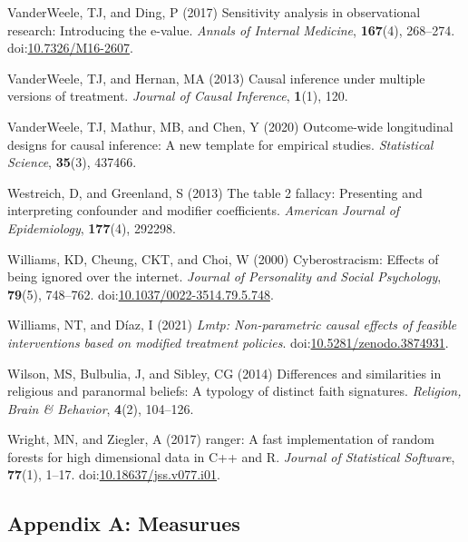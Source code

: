 \documentclass[
  singlecolumn]{article}
\newlength{\cslhangindent}
\newenvironment{CSLReferences}[2] %
 {\begin{list}{}{%
  \setlength{\itemindent}{0pt}
  \setlength{\leftmargin}{0pt}
  \setlength{\parsep}{0pt}
  \ifodd #1
   \setlength{\leftmargin}{\cslhangindent}
   \setlength{\itemindent}{-1\cslhangindent}
  \fi
  \setlength{\itemsep}{#2\baselineskip}}}
 {\end{list}}
\begin{document}
\begin{CSLReferences}{1}{0}
VanderWeele, TJ, and Ding, P (2017) Sensitivity analysis in
observational research: Introducing the e-value. \emph{Annals of
Internal Medicine}, \textbf{167}(4), 268--274.
doi:\href{https://doi.org/10.7326/M16-2607}{10.7326/M16-2607}.

VanderWeele, TJ, and Hernan, MA (2013) Causal inference under multiple
versions of treatment. \emph{Journal of Causal Inference},
\textbf{1}(1), 120.

VanderWeele, TJ, Mathur, MB, and Chen, Y (2020) Outcome-wide
longitudinal designs for causal inference: A new template for empirical
studies. \emph{Statistical Science}, \textbf{35}(3), 437466.

Westreich, D, and Greenland, S (2013) The table 2 fallacy: Presenting
and interpreting confounder and modifier coefficients. \emph{American
Journal of Epidemiology}, \textbf{177}(4), 292298.

Williams, KD, Cheung, CKT, and Choi, W (2000) Cyberostracism: Effects of
being ignored over the internet. \emph{Journal of Personality and Social
Psychology}, \textbf{79}(5), 748--762.
doi:\href{https://doi.org/10.1037/0022-3514.79.5.748}{10.1037/0022-3514.79.5.748}.

Williams, NT, and Díaz, I (2021) \emph{Lmtp: Non-parametric causal
effects of feasible interventions based on modified treatment policies}.
doi:\href{https://doi.org/10.5281/zenodo.3874931}{10.5281/zenodo.3874931}.

Wilson, MS, Bulbulia, J, and Sibley, CG (2014) Differences and
similarities in religious and paranormal beliefs: A typology of distinct
faith signatures. \emph{Religion, Brain \& Behavior}, \textbf{4}(2),
104--126.

Wright, MN, and Ziegler, A (2017) {ranger}: A fast implementation of
random forests for high dimensional data in {C++} and {R}. \emph{Journal
of Statistical Software}, \textbf{77}(1), 1--17.
doi:\href{https://doi.org/10.18637/jss.v077.i01}{10.18637/jss.v077.i01}.

\end{CSLReferences}

\newpage{}

\subsection{Appendix A: Measurues}\label{appendix-measures}
\end{document}
